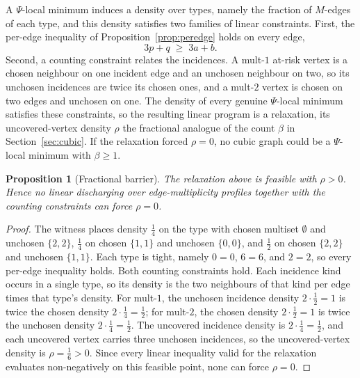 \documentclass[11pt]{article}
\newtheorem{proposition}{Proposition}
\theoremstyle{definition}
\theoremstyle{remark}
\newcommand{\Pot}{\Psi}
\begin{document}
A $\Pot$-local minimum induces a density over types, namely the fraction of
$M$-edges of each type, and this density satisfies two families of linear
constraints. First, the per-edge inequality of Proposition~\ref{prop:peredge}
holds on every edge,
\[
  3p + q \;\ge\; 3a + b.
\]
Second, a counting constraint relates the incidences. A mult-$1$ at-risk vertex is a chosen
neighbour on one incident edge and an unchosen neighbour on two, so its unchosen
incidences are twice its chosen ones, and a mult-$2$ vertex is chosen on two
edges and unchosen on one. The density of every genuine $\Pot$-local minimum
satisfies these constraints, so the resulting linear program is a relaxation,
its uncovered-vertex density $\rho$ the fractional analogue of the count $\beta$ in
Section~\ref{sec:cubic}. If the relaxation forced $\rho = 0$, no cubic graph
could be a $\Pot$-local minimum with $\beta \ge 1$.

\begin{proposition}[Fractional barrier]\label{prop:barrier}
The relaxation above is feasible with $\rho > 0$. Hence no linear
discharging over edge-multiplicity profiles together with the counting
constraints can force $\rho = 0$.
\end{proposition}

\begin{proof}
The witness places density $\tfrac14$ on the type with chosen multiset $\emptyset$
and unchosen $\{2,2\}$, $\tfrac14$ on chosen $\{1,1\}$ and unchosen $\{0,0\}$, and
$\tfrac12$ on chosen $\{2,2\}$ and unchosen $\{1,1\}$. Each
type is tight, namely $0=0$, $6=6$, and $2=2$, so every per-edge
inequality holds. Both counting constraints hold. Each incidence kind occurs in a
single type, so its density is the two neighbours of that kind per edge times
that type's density. For mult-$1$, the unchosen incidence
density $2\cdot\tfrac12 = 1$ is twice the chosen density $2\cdot\tfrac14 =
\tfrac12$; for mult-$2$, the chosen density $2\cdot\tfrac12 = 1$ is twice the
unchosen density $2\cdot\tfrac14 = \tfrac12$. The uncovered incidence
density is $2\cdot\tfrac14 = \tfrac12$, and each uncovered vertex carries three
unchosen incidences, so the uncovered-vertex density is $\rho = \tfrac16 > 0$.
Since every linear inequality valid for the relaxation evaluates non-negatively on
this feasible point, none can force $\rho = 0$.
\end{proof}
\end{document}
